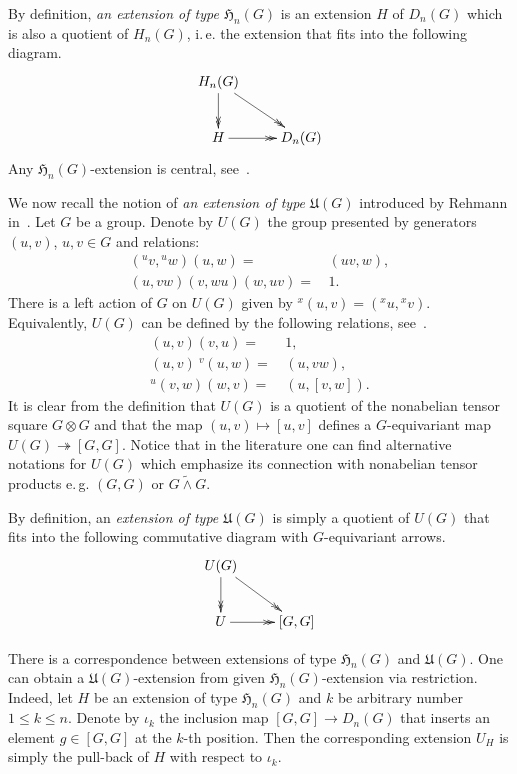 \documentclass[oneside, 12pt]{amsart}
\theoremstyle{plain}
\numberwithin{equation}{section}
\numberwithin{lemma}{section}
\theoremstyle{remark}
\theoremstyle{definition}
\begin{document}
By definition, {\it an extension of type $\mathfrak{H}_n(G)$} is an extension $H$ of $D_n(G)$ which is also a quotient of $H_n(G)$, i.\,e. 
 the extension that fits into the following diagram.
\[ \xymatrix{ H_n(G) \ar@{->>}[rd] \ar@{->>}[d] & \\ H \ar@{->>}[r] & D_n(G)} \]
Any $\mathfrak{H}_n(G)$-extension is central, see~\cite[Proposition~2.3]{Reh78}.

We now recall the notion of \emph{an extension of type $\mathfrak{U}(G)$} introduced by Rehmann in~\cite[\S~1]{Reh78}.
Let $G$ be a group. Denote by $U(G)$ the group presented by generators $(u, v)$, $u,v\in G$ and relations:
\begin{align}
 ({}^{u} v, {}^{u}w) (u,  w) = &\, (uv, w), \tag{U1} \label{U1} \\
 (u,  vw) (v,  wu) (w,  uv)  = &\, 1.       \tag{U2} \label{U2}
\end{align}
There is a left action of $G$ on $U(G)$ given by ${}^x (u, v) = ({}^{x}u, {}^{x}v).$
Equivalently, $U(G)$ can be defined by the following relations, see~\cite[p.~8]{De76}.
\begin{align} 
 (u, v) (v, u)     = &\, 1,          \label{U4} \\
 (u, v) \ {}^v(u, w) = &\, (u, vw),  \label{U6} \\
 {}^u(v, w)(w, v)  = &\, (u, [v, w]).\label{U9} \end{align}
It is clear from the definition that $U(G)$ is a quotient of the nonabelian tensor square $G\otimes G$ and that
the map $(u, v) \mapsto [u, v]$ defines a $G$-equivariant map $U(G) \twoheadrightarrow [G, G]$.
Notice that in the literature one can find alternative notations for $U(G)$ which emphasize its
 connection with nonabelian tensor products e.\,g. $(G, G)$ or $G \mathbin{\widetilde{\wedge}} G$.
 
By definition, an {\it extension of type $\mathfrak{U}(G)$} is simply a quotient of $U(G)$
 that fits into the following commutative diagram with $G$-equivariant arrows.
\[ \xymatrix{ U(G) \ar@{->>}[rd] \ar@{->>}[d] & \\ U \ar@{->>}[r] & [G, G]} \]

There is a correspondence between extensions of type $\mathfrak{H}_n(G)$ and $\mathfrak{U}(G)$.
One can obtain a $\mathfrak{U}(G)$-extension from given $\mathfrak{H}_n(G)$-extension via restriction.
Indeed, let $H$ be an extension of type $\mathfrak{H}_n(G)$ and $k$ be arbitrary number $1\leq k\leq n$.
Denote by $\iota_k$ the inclusion map $[G, G] \to D_n(G)$ that inserts an element $g \in [G, G]$ at the $k$-th position.
Then the corresponding extension $U_H$ is simply the pull-back of $H$ with respect to $\iota_k$.
\end{document}
